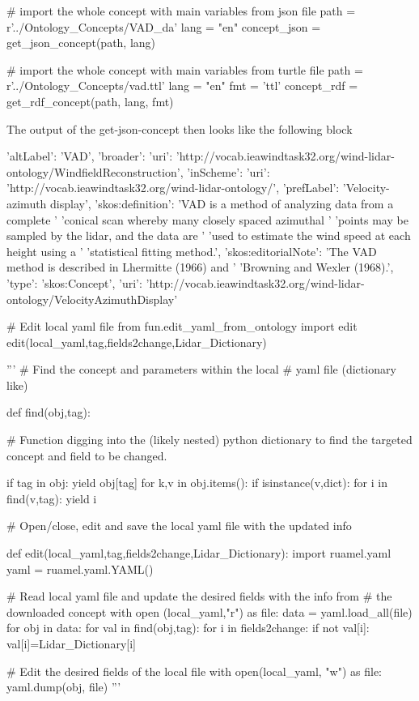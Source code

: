 \documentclass[remotesensing,article,submit,pdftex,moreauthors]{Definitions/mdpi}
\begin{document}
\begin{python}
    # import the whole concept with main variables from json file
    path = r'../Ontology_Concepts/VAD_da'
    lang = "en"
    concept_json = get_json_concept(path, lang)

    # import the whole concept with main variables from turtle file
    path = r'../Ontology_Concepts/vad.ttl'
    lang = "en"
    fmt = 'ttl'
    concept_rdf = get_rdf_concept(path, lang, fmt)

\end{python}

The output of the get-json-concept then looks like the following block

\begin{python}
    {   'altLabel': 'VAD',
    'broader': {   'uri': 'http://vocab.ieawindtask32.org/wind-lidar-ontology/WindfieldReconstruction'},
    'inScheme': {'uri': 'http://vocab.ieawindtask32.org/wind-lidar-ontology/'},
    'prefLabel': 'Velocity-azimuth display',
    'skos:definition': 'VAD is a method of analyzing data from a complete '
                       'conical scan whereby many closely spaced azimuthal '
                       'points may be sampled by the lidar, and the data are '
                       'used to estimate the wind speed at each height using a '
                       'statistical fitting method.',
    'skos:editorialNote': 'The VAD method is described in Lhermitte (1966) and '
                          'Browning and Wexler (1968).',
    'type': 'skos:Concept',
    'uri': 'http://vocab.ieawindtask32.org/wind-lidar-ontology/VelocityAzimuthDisplay'}
\end{python}
\begin{python}

# Edit local yaml file
from fun.edit_yaml_from_ontology import edit
edit(local_yaml,tag,fields2change,Lidar_Dictionary) 

'''
# Find the concept and parameters within the local
# yaml file (dictionary like) 

def find(obj,tag):
    
    # Function digging into the (likely nested) python dictionary to find the targeted concept and field to be changed.
    
    if tag in obj:
        yield obj[tag]
    for k,v in obj.items():       
        if isinstance(v,dict):
            for i in find(v,tag):
                yield i                

# Open/close, edit and save the local yaml file with the updated info     

def edit(local_yaml,tag,fields2change,Lidar_Dictionary):
    import ruamel.yaml
    yaml = ruamel.yaml.YAML()
    
    # Read local yaml file and update the desired fields with the info from 
    # the downloaded concept  
    with open (local_yaml,"r") as file:
        data = yaml.load_all(file)
        for obj in data:
            for val in find(obj,tag):
                for i in fields2change:
                    if not val[i]:
                        val[i]=Lidar_Dictionary[i]
    
    # Edit the desired fields of the local file
    with open(local_yaml, "w") as file:
        yaml.dump(obj, file)
'''    
\end{python}
\end{document}
